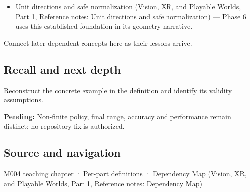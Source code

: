 \hypertarget{appendix-7f1e17dcafb1-used-by}{}

\begin{itemize}
\tightlist
\item
  \href{../07-Vision-XR-and-Playable-Worlds-P01/main.pdf\#nameddest=appendix-f744e41b95b4}{Unit directions and safe normalization (Vision, XR, and Playable Worlds, Part 1, Reference notes: Unit directions and safe normalization)} --- Phase 6 uses this established foundation in its geometry narrative.
\end{itemize}

Connect later dependent concepts here as their lessons arrive.

\subsection{Recall and next depth}\label{appendix-7f1e17dcafb1-recall-and-next-depth}

\hypertarget{appendix-7f1e17dcafb1-recall-and-next-depth}{}

Reconstruct the concrete example in the definition and identify its validity assumptions.

\textbf{Pending:} Non-finite policy, final range, accuracy and performance remain distinct; no repository fix is authorized.

\subsection{Source and navigation}\label{appendix-7f1e17dcafb1-source-and-navigation}

\hypertarget{appendix-7f1e17dcafb1-source-and-navigation}{}

\hyperref[01-foundations-i-ch001-a-stretching-ruler-for-real-valued-quantities]{M004 teaching chapter} · \hyperref[appendix-fd090d982a15-m004---parts-61-76]{Per-part definitions} · \href{../07-Vision-XR-and-Playable-Worlds-P01/main.pdf\#nameddest=appendix-4ad47bdd269a}{Dependency Map (Vision, XR, and Playable Worlds, Part 1, Reference notes: Dependency Map)}
